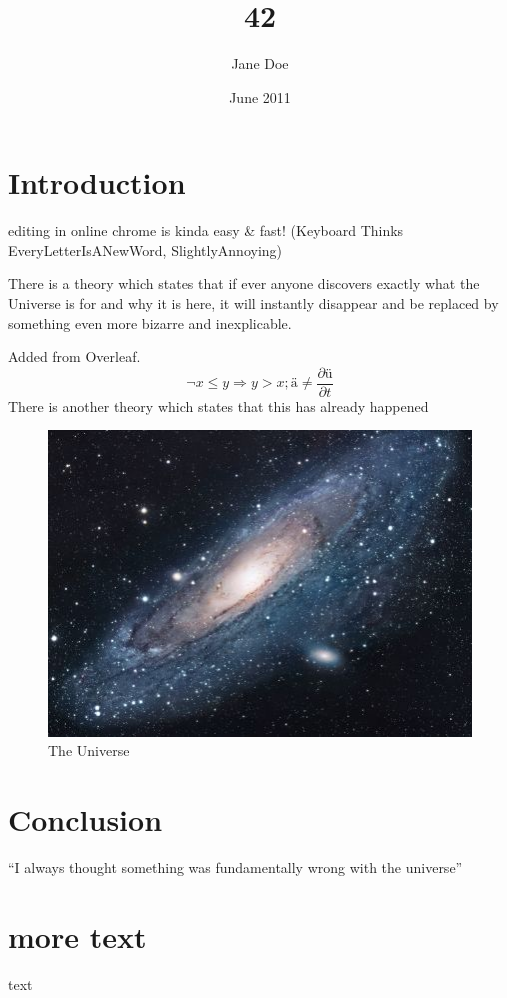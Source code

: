 \documentclass{article}
\title{42}
\author{Jane Doe}
\date{June 2011}
\begin{document}
\maketitle

\section{Introduction}

editing in online chrome is kinda easy \& fast!
(Keyboard Thinks EveryLetterIsANewWord, SlightlyAnnoying)

There is a theory which states that if ever anyone discovers exactly what
 the Universe is for and why it is here, 
it will instantly disappear and be replaced by something even more bizarre 
and inexplicable.

Added from Overleaf.
$$¬ x ≤ y ⇒ y > x; ä ≠ \frac{∂ü}{∂t}$$
There is another theory which states that this has already happened

\begin{figure}[h!]
\centering
\includegraphics[scale=1.7]{universe.jpg}
\caption{The Universe}
\label{threadsVsSync}
\end{figure}

\section{Conclusion}
``I always thought something was fundamentally wrong with the universe'' \citep{adams1995hitchhiker}




\section{more text}
text
\end{document}
